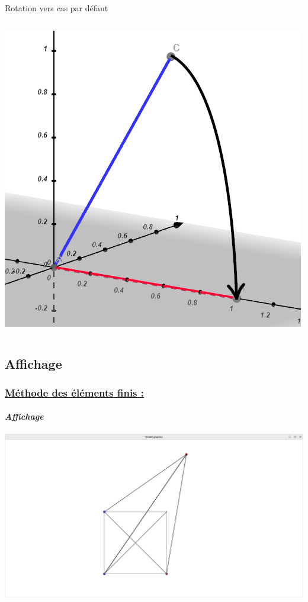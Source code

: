 \documentclass[10pt]{beamer}
\begin{document}
\begin{frame}
\begin{block}{Rotation vers cas par d\'efaut}
\begin{columns}[t]
\begin{column}{5cm}
 				 	\includegraphics[scale=0.2]{Images/CasFinal.png}
				 \end{column}
 			\end{columns}
		\end{block}
	\end{frame}
	\subsection{Affichage}
	\begin{frame}
		\frametitle{\uline{M\'ethode des \'el\'ements finis :}}
		\framesubtitle{\textit{Affichage}}
		\includegraphics[scale = 0.17]{Images/Copium.png}
	\end{frame} 
\end{document}
